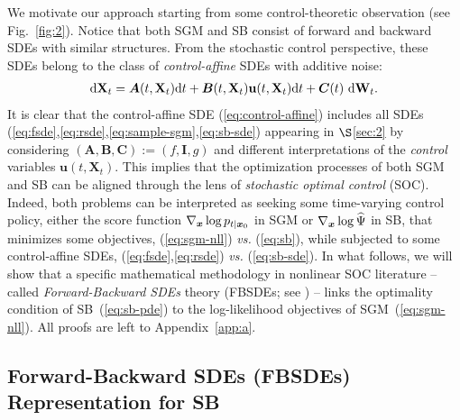 \documentclass{article}
\def\eqref#1{(\ref{#1})}
\def\rd{{\textnormal{d}}}
\def\rvu{{\mathbf{i}}}
\def\rvu{{\mathbf{u}}}
\def\rvX{{\mathbf{X}}}
\def\mA{{\bm{A}}}
\def\mB{{\bm{B}}}
\def\mC{{\bm{C}}}
\def\mI{{\bm{I}}}
\def\wt{{ \mathbf{W}_t }}
\def\dwt{{ \mathrm{d} \wt }}
\def\dt{{ \mathrm{d} t }}
\begin{document}
We motivate our approach starting from some control-theoretic observation (see Fig.~\ref{fig:2}).
Notice that both SGM and SB consist of forward and backward SDEs with similar structures.
From the stochastic control perspective, these SDEs belong to the class of
\emph{control-affine} SDEs with {additive} noise:
\begin{align}
    \rd \rvX_t = \mA(t,\rvX_t) \dt + \mB(t,\rvX_t) \rvu(t,\rvX_t) \dt + \mC(t)~\dwt.
    \label{eq:control-affine}
\end{align}
It is clear that the
control-affine SDE \eqref{eq:control-affine} includes all SDEs (\ref{eq:fsde},\ref{eq:rsde},\ref{eq:sample-sgm},\ref{eq:sb-sde}) appearing in $\S$\ref{sec:2}
by considering $(\mA,\mB,\mC) := (f,\mI,g)$ and different interpretations of the \emph{control} variables $\rvu(t,\rvX_t)$.
This implies that
the optimization processes of
both SGM and SB can be aligned through the lens of \textit{{stochastic optimal control}} (SOC).
Indeed,
both problems can be interpreted as seeking some time-varying control policy,
either the score function ${ \nabla_{\bm{x}}\log p_{t|{\bm{x}}_0} }$ in SGM or ${\nabla_{\bm{x}} \log \widehat{\Psi}}$ in SB,
that minimizes some objectives, \eqref{eq:sgm-nll} \textit{vs.} \eqref{eq:sb},
while subjected to some control-affine SDEs, (\ref{eq:fsde},\ref{eq:rsde}) \textit{vs.} \eqref{eq:sb-sde}.
In what follows, we will show that
a specific mathematical methodology in nonlinear SOC literature
--
called \textit{Forward-Backward SDEs} theory (FBSDEs; see \citet{ma1999forward}) --
links the optimality condition of SB~\eqref{eq:sb-pde}
to the log-likelihood objectives of SGM~\eqref{eq:sgm-nll}.
All proofs are left to Appendix~\ref{app:a}.

\vspace{-1pt}
\subsection{Forward-Backward SDEs (FBSDEs) Representation for SB} \label{sec:3.1}
\vspace{-1pt}
\end{document}
